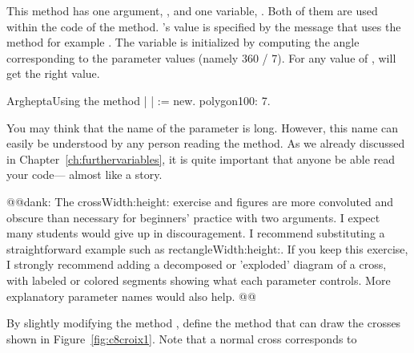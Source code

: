 This method has one argument, , and one variable, . Both of them are used within the code of the method. \newcommand{\replace}[2]{\ct{sideNumber}}{'s} value is specified by \newcommand{\replace}[2]{a}{the} message that uses the method\newcommand{\add}[1]{,} for example \newcommand{\replace}[2]{, while the}{. The} variable  is initialized by computing the angle corresponding to the parameter values (\newcommand{\replace}[2]{here}{namely} 360 / 7\newcommand{\add}[1]{ in our example}). For \newcommand{\replace}[2]{each}{any} value of \newcommand{\replace}[2]{the \ct{sideNumber}}{},  will \newcommand{\replace}[2]{then take a specific}{get the right} value\newcommand{\add}[1]{ for the polygon}.

\begin{scriptfig}{Arghepta}{Using the method }\label{src:heptagon}
| \caro |
\caro := \Turtle new.
\caro polygon100: 7.
\end{scriptfig}

You may think that the name of the parameter  is long. However, this name can easily be understood by any person reading the method. As we already discussed in Chapter~\ref{ch:furthervariables}, it is quite important that anyone be able \newcommand{\add}[1]{to} read your code\newcommand{\replace}[2]{,}{---} almost like a \newcommand{\replace}[2]{novel}{story}. 


@@dank: The crossWidth:height: exercise and figures are more convoluted and obscure than necessary for beginners' practice with two arguments.  I expect many students would give up in discouragement.  I recommend substituting a straightforward example such as rectangleWidth:height:. If you keep this exercise, I strongly recommend adding a decomposed or 'exploded' diagram of a cross, with labeled or colored segments showing what each parameter controls. More explanatory parameter names would also help. @@
\begin{exonofig}
By slightly modifying the method , define the method
 that \newcommand{\replace}[2]{allows you to}{can} draw the \newcommand{\replace}[2]{picture}{crosses} shown in
Figure~\ref{fig:c8croix1}.  Note that a normal cross corresponds to
\end{exonofig}


